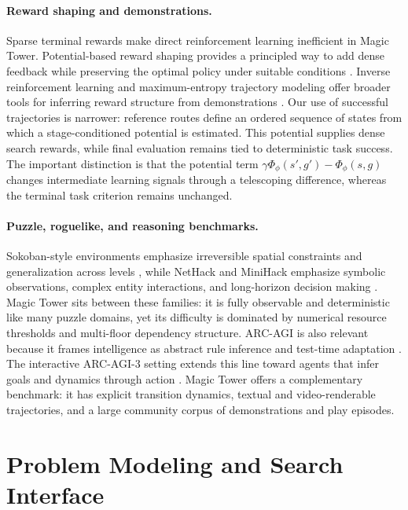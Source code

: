 \documentclass{article}
\begin{document}
\paragraph{Reward shaping and demonstrations.}
Sparse terminal rewards make direct reinforcement learning inefficient in
Magic Tower.  Potential-based reward shaping provides a principled way to add
dense feedback while preserving the optimal policy under suitable conditions
\citep{ng1999policy}.  Inverse reinforcement learning and maximum-entropy
trajectory modeling offer broader tools for inferring reward structure from
demonstrations \citep{ziebart2008maxent}.  Our use of successful trajectories
is narrower: reference routes define an ordered sequence of states from which a
stage-conditioned potential is estimated.  This potential supplies dense
search rewards, while final evaluation remains tied to deterministic task
success.  The important distinction is that the potential term
\(\gamma\Phi_\phi(s',g')-\Phi_\phi(s,g)\) changes intermediate learning signals
through a telescoping difference, whereas the terminal task criterion remains
unchanged.

\paragraph{Puzzle, roguelike, and reasoning benchmarks.}
Sokoban-style environments emphasize irreversible spatial constraints and
generalization across levels \citep{justesen2018sokoban}, while NetHack and
MiniHack emphasize symbolic observations, complex entity interactions, and
long-horizon decision making \citep{kuttler2020nle}.  Magic Tower sits between
these families: it is fully observable and deterministic like many puzzle
domains, yet its difficulty is dominated by numerical resource thresholds and
multi-floor dependency structure.  ARC-AGI is also relevant because it frames
intelligence as abstract rule inference and test-time adaptation
\citep{chollet2019measure,chollet2024arcprize,chollet2025arcagi2}.  The
interactive ARC-AGI-3 setting extends this line toward agents that infer goals
and dynamics through action \citep{arcprize2026arcagi3,rodionov2026executable}.
Magic Tower offers a complementary benchmark: it has explicit transition
dynamics, textual and video-renderable trajectories, and a large community
corpus of demonstrations and play episodes.

\section{Problem Modeling and Search Interface}
\end{document}
